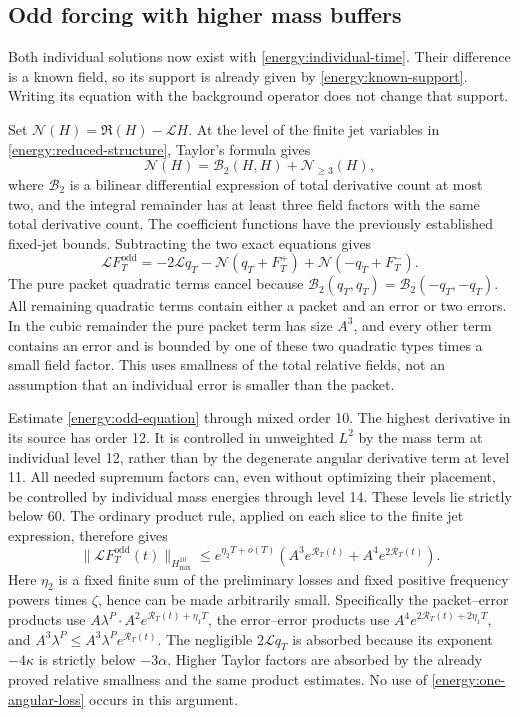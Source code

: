 \subsection{Odd forcing with higher mass buffers}

Both individual solutions now exist with
\eqref{energy:individual-time}. Their difference is a known field,
so its support is already given by \eqref{energy:known-support}.
Writing its equation with the background operator does not change
that support.

Set \(\mathcal N(H)=\mathfrak R(H)-\mathcal LH\). At the level of
the finite jet variables in \eqref{energy:reduced-structure}, Taylor's
formula gives
\[
 \mathcal N(H)=\mathcal B_2(H,H)+\mathcal N_{\ge3}(H),
\]
where \(\mathcal B_2\) is a bilinear differential expression of
total derivative count at most two, and the integral remainder has
at least three field factors with the same total derivative count.
The coefficient functions have the previously established fixed-jet
bounds. Subtracting the two exact equations gives
\begin{equation}\label{energy:odd-equation}
 \mathcal LF_T^{\mathrm{odd}}
  =-2\mathcal Lq_T
     -\mathcal N(q_T+F_T^+)+\mathcal N(-q_T+F_T^-).
\end{equation}
The pure packet quadratic terms cancel because
\(\mathcal B_2(q_T,q_T)=\mathcal B_2(-q_T,-q_T)\).
All remaining quadratic terms contain either a packet and an error
or two errors. In the cubic remainder the pure packet term has size
\(A^3\), and every other term contains an error and is bounded by
one of these two quadratic types times a small field factor. This
uses smallness of the total relative fields, not an assumption that
an individual error is smaller than the packet.

Estimate \eqref{energy:odd-equation} through mixed order 10. The
highest derivative in its source has order 12. It is controlled in
unweighted \(L^2\) by the mass term at individual level 12, rather
than by the degenerate angular derivative term at level 11. All
needed supremum factors can, even without optimizing their placement,
be controlled by individual mass energies through level 14. These
levels lie strictly below 60. The ordinary product rule, applied on
each slice to the finite jet expression, therefore gives
\begin{equation}\label{energy:odd-source}
 \lVert\mathcal LF_T^{\mathrm{odd}}(t)\rVert_{H^{10}_{\mathrm{mix}}}
 \le e^{\eta_2T+o(T)}
       \left(A^3e^{\mathcal R_T(t)}
                      +A^4e^{2\mathcal R_T(t)}\right).
\end{equation}
Here \(\eta_2\) is a fixed finite sum of the preliminary losses
and fixed positive frequency powers times \(\zeta\), hence can be
made arbitrarily small. Specifically the packet--error products use
\(A\lambda^P\cdot A^2e^{\mathcal R_T(t)+\eta_1T}\), the
error--error products use
\(A^4e^{2\mathcal R_T(t)+2\eta_1T}\), and
\(A^3\lambda^P\le A^3\lambda^P e^{\mathcal R_T(t)}\).
The negligible \(2\mathcal Lq_T\) is absorbed because its exponent
\(-4\kappa\) is strictly below \(-3\alpha\). Higher Taylor
factors are absorbed by the already proved relative smallness and
the same product estimates. No use of
\eqref{energy:one-angular-loss} occurs in this argument.

